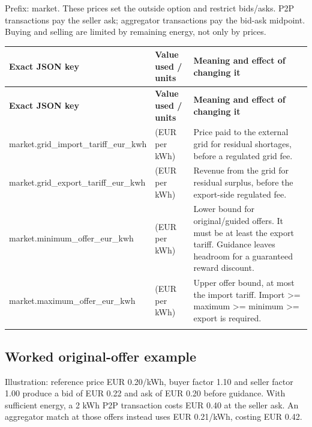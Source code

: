 \documentclass[a4paper,11pt]{article}
\begin{document}
Prefix: market. These prices set the outside option and restrict bids/asks. P2P transactions pay the seller ask; aggregator transactions pay the bid-ask midpoint. Buying and selling are limited by remaining energy, not only by prices.
\par\medskip

\begingroup\small
\begin{longtable}{>{\RaggedRight\arraybackslash}p{}>{\RaggedRight\arraybackslash}p{}>{\RaggedRight\arraybackslash}p{}}
\toprule
\textbf{Exact JSON key} & \textbf{Value used / units} & \textbf{Meaning and effect of changing it} \\ \midrule
\endfirsthead
\toprule
\textbf{Exact JSON key} & \textbf{Value used / units} & \textbf{Meaning and effect of changing it} \\ \midrule
\endhead
market.\allowbreak{}grid\_\allowbreak{}import\_\allowbreak{}tariff\_\allowbreak{}eur\_\allowbreak{}kwh & 0.3 (EUR per kWh) & Price paid to the external grid for residual shortages, before a regulated grid fee. \\ \addlinespace[3pt]
market.\allowbreak{}grid\_\allowbreak{}export\_\allowbreak{}tariff\_\allowbreak{}eur\_\allowbreak{}kwh & 0.06 (EUR per kWh) & Revenue from the grid for residual surplus, before the export-side regulated fee. \\ \addlinespace[3pt]
market.\allowbreak{}minimum\_\allowbreak{}offer\_\allowbreak{}eur\_\allowbreak{}kwh & 0.06 (EUR per kWh) & Lower bound for original/guided offers. It must be at least the export tariff. Guidance leaves headroom for a guaranteed reward discount. \\ \addlinespace[3pt]
market.\allowbreak{}maximum\_\allowbreak{}offer\_\allowbreak{}eur\_\allowbreak{}kwh & 0.3 (EUR per kWh) & Upper offer bound, at most the import tariff. Import >= maximum >= minimum >= export is required. \\ \addlinespace[3pt]
\bottomrule
\end{longtable}
\endgroup

\subsection*{Worked original-offer example}
\par\medskip

Illustration: reference price EUR 0.20/kWh, buyer factor 1.10 and seller factor 1.00 produce a bid of EUR 0.22 and ask of EUR 0.20 before guidance. With sufficient energy, a 2 kWh P2P transaction costs EUR 0.40 at the seller ask. An aggregator match at those offers instead uses EUR 0.21/kWh, costing EUR 0.42.
\par\medskip
\end{document}
